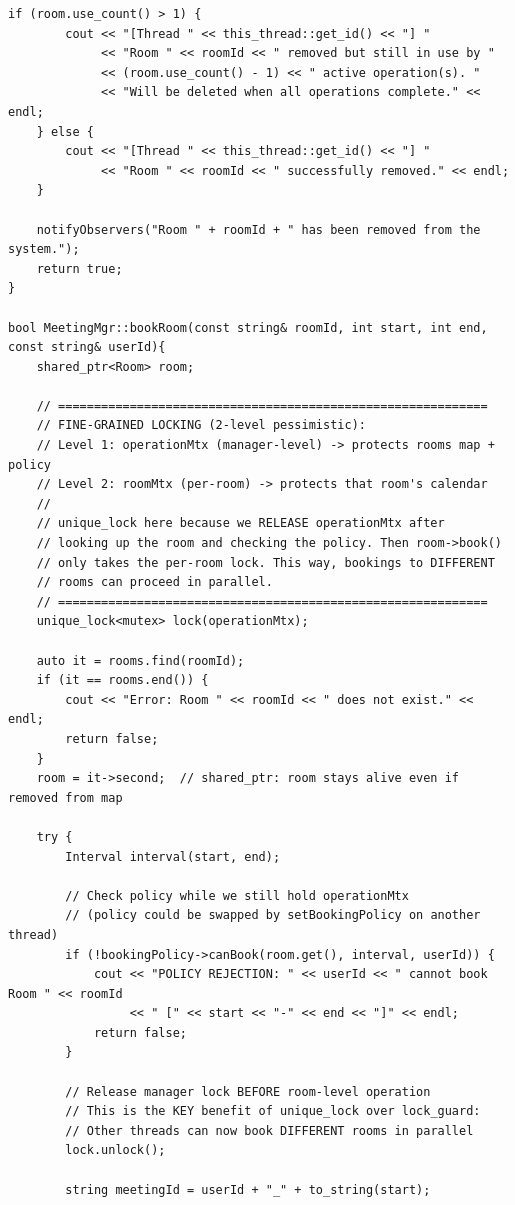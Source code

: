 \documentclass[11pt,a4paper]{article}
\begin{document}
\begin{lstlisting}[title={\texttt{managers.cpp}}]
    if (room.use_count() > 1) {
        cout << "[Thread " << this_thread::get_id() << "] "
             << "Room " << roomId << " removed but still in use by " 
             << (room.use_count() - 1) << " active operation(s). "
             << "Will be deleted when all operations complete." << endl;
    } else {
        cout << "[Thread " << this_thread::get_id() << "] "
             << "Room " << roomId << " successfully removed." << endl;
    }
    
    notifyObservers("Room " + roomId + " has been removed from the system.");
    return true;
}

bool MeetingMgr::bookRoom(const string& roomId, int start, int end, const string& userId){
    shared_ptr<Room> room;
    
    // ============================================================
    // FINE-GRAINED LOCKING (2-level pessimistic):
    // Level 1: operationMtx (manager-level) -> protects rooms map + policy
    // Level 2: roomMtx (per-room) -> protects that room's calendar
    //
    // unique_lock here because we RELEASE operationMtx after
    // looking up the room and checking the policy. Then room->book()
    // only takes the per-room lock. This way, bookings to DIFFERENT
    // rooms can proceed in parallel.
    // ============================================================
    unique_lock<mutex> lock(operationMtx);
    
    auto it = rooms.find(roomId);
    if (it == rooms.end()) {
        cout << "Error: Room " << roomId << " does not exist." << endl;
        return false;
    }
    room = it->second;  // shared_ptr: room stays alive even if removed from map

    try {
        Interval interval(start, end);
        
        // Check policy while we still hold operationMtx
        // (policy could be swapped by setBookingPolicy on another thread)
        if (!bookingPolicy->canBook(room.get(), interval, userId)) {
            cout << "POLICY REJECTION: " << userId << " cannot book Room " << roomId 
                 << " [" << start << "-" << end << "]" << endl;
            return false;
        }
        
        // Release manager lock BEFORE room-level operation
        // This is the KEY benefit of unique_lock over lock_guard:
        // Other threads can now book DIFFERENT rooms in parallel
        lock.unlock();
        
        string meetingId = userId + "_" + to_string(start);
        

\end{lstlisting}
\end{document}
